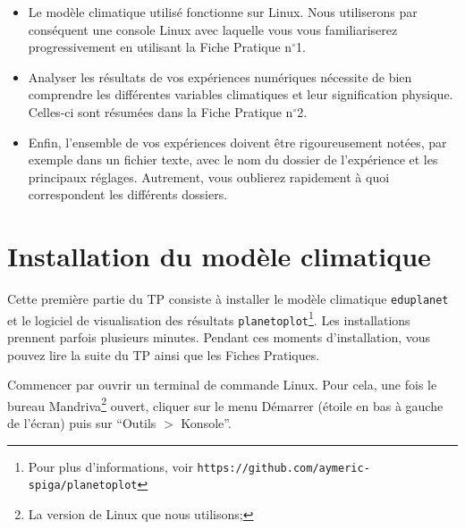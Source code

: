 \documentclass[a4paper,12pt]{article}
\begin{document}
\begin{itemize}
\item Le modèle climatique utilisé fonctionne sur Linux. Nous utiliserons par
conséquent une console Linux avec laquelle vous vous familiariserez
progressivement en utilisant la Fiche Pratique n$^\circ$1.
\item Analyser les résultats de vos expériences numériques nécessite de bien
comprendre les différentes variables climatiques et leur signification
physique. Celles-ci sont résumées dans la Fiche Pratique n$^\circ$2.
\item Enfin, l'ensemble de vos expériences doivent être rigoureusement notées,
par exemple dans un fichier texte, avec le nom du dossier de l'expérience et
les principaux réglages. Autrement, vous oublierez rapidement à quoi
correspondent les différents dossiers.
\end{itemize}

\section{Installation du modèle climatique}

Cette première partie du TP consiste à installer le modèle climatique \texttt
{eduplanet} et le logiciel de visualisation des résultats \texttt
{planetoplot}\footnote{Pour plus d'informations, voir
\texttt{https://github.com/aymeric-spiga/planetoplot}}. Les installations
prennent parfois plusieurs minutes. Pendant ces moments d'installation, vous
pouvez lire la suite du TP ainsi que les Fiches Pratiques.

Commencer par ouvrir un terminal de commande Linux. Pour cela, une fois le
bureau Mandriva\footnote{La version de Linux que nous utilisons;} ouvert,
cliquer sur le menu Démarrer (étoile en bas à gauche de l'écran) puis sur
``Outils $>$ Konsole''.
\end{document}
